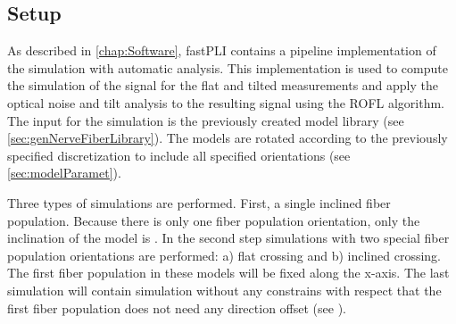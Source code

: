 \subsection{Setup} %
\label{sec:simParameterEnv}
% 
%
As described in \cref{chap:Software}, \ac{fastPLI} contains a pipeline implementation of the simulation with automatic analysis.
This implementation is used to compute the simulation of the signal for the flat and tilted measurements and apply the optical noise and tilt analysis to the resulting signal using the \ac{ROFL} algorithm. 
The input for the simulation is the previously created model library (see \cref{sec:genNerveFiberLibrary}).
The models are rotated according to the previously specified discretization to include all specified orientations (see \cref{sec:modelParamet}).
\par
% 
Three types of simulations are performed. First, a single inclined fiber population.
Because there is only one fiber population orientation, only the inclination of the model is \dummy{}.
In the second step simulations with two special fiber population orientations are performed: a) flat crossing and b) inclined crossing.
The first fiber population in these models will be fixed along the x-axis.
The last simulation will contain simulation without any constrains with respect that the first fiber population does not need any direction offset (see \dummy{}).
\par
% 
